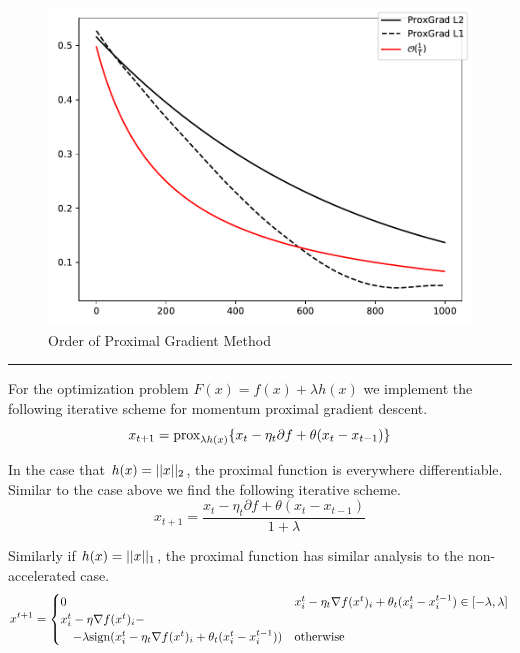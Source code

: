 \documentclass[11pt, answers]{exam}
\begin{document}
\begin{questions}
\begin{solution}
		\begin{figure}[H]
		\centering
		\includegraphics[width=.75\textwidth]{../out/ProxGrad.pdf}
		\caption{Order of Proximal Gradient Method}
		\end{figure}
		
		\vspace{.5in}\hrule\vspace{.5in}
		
		For the optimization problem $F(x)=f(x)+\lambda h(x)$
		we implement the following iterative scheme for momentum proximal gradient descent.
		$$ x_{t+1}=\text{prox}_{\lambda h(x)}\{x_t -\eta_t\partial f + \theta(x_t-x_{t-1})\}$$
		
		In the case that $h(x)=|| x ||_2$, the proximal function is everywhere differentiable. Similar to the case above we find the following iterative scheme.
		$$x_{t+1}=\frac{x_t-\eta_t\partial f+\theta(x_t-x_{t-1})}{1+\lambda}$$
		
		Similarly if $h(x)=|| x ||_1$, the proximal function has similar analysis to the non-accelerated case.
		\begin{align*}
			x^{t+1} = \begin{cases}0 & x^t_i-\eta_t\nabla f(x^t)_i+\theta_t(x^t_i-x^{t-1}_i)\in [-\lambda, \lambda]\\
			x^t_i-\eta\nabla f(x^t)_i-&\\
			\quad-\lambda\text{sign}(x^t_i-\eta_t\nabla f(x^t)_i+\theta_t(x^t_i-x^{t-1}_i)) & \text{otherwise}
		\end{cases}
		\end{align*}	
		

\end{solution}
\end{questions}
\end{document}
